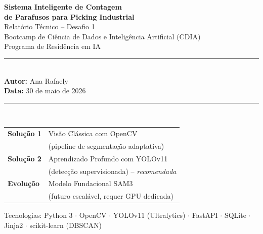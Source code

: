 \documentclass[12pt,a4paper]{article}
\begin{document}
\begin{titlepage}
  \centering
  \vspace*{1.8cm}
  {\huge\bfseries\color{primary}
    Sistema Inteligente de Contagem\\[0.4em]
    de Parafusos para Picking Industrial\\[1.2em]}
  {\large\color{darkgray}
    Relat\'orio T\'ecnico -- Desafio 1\\
    Bootcamp de Ci\^encia de Dados e Intelig\^encia Artificial (CDIA)\\
    Programa de Resid\^encia em IA\\[1.8cm]}
  \rule{\linewidth}{0.5pt}\\[0.4em]
  {\normalsize
    \textbf{Autor:} Ana Rafaely\\[0.3em]
    \textbf{Data:} 30 de maio de 2026\\[0.3em]
  }
  \rule{\linewidth}{0.5pt}\\[1.2cm]
  \begin{tcolorbox}[colback=lightblue, colframe=primary, arc=6pt,
                    title={\bfseries Solu\c{c}\~oes desenvolvidas e comparadas \quad(vers\~ao 2)}]
    \begin{tabular}{ll}
      \textbf{Solu\c{c}\~ao 1} & Vis\~ao Cl\'assica com OpenCV\\
                                & (pipeline de segmenta\c{c}\~ao adaptativa)\\[4pt]
      \textbf{Solu\c{c}\~ao 2} & Aprendizado Profundo com YOLOv11\\
                                & (detec\c{c}\~ao supervisionada) -- \emph{recomendada}\\[4pt]
      \textbf{Evolu\c{c}\~ao}  & Modelo Fundacional SAM3\\
                                & (futuro escal\'avel, requer GPU dedicada)\\
    \end{tabular}
  \end{tcolorbox}
  \vfill
  {\small\color{gray}
    Tecnologias: Python 3 $\cdot$ OpenCV $\cdot$ YOLOv11 (Ultralytics) $\cdot$
    FastAPI $\cdot$ SQLite $\cdot$ Jinja2 $\cdot$ scikit-learn (DBSCAN)
  }
\end{titlepage}

\tableofcontents
\newpage

\end{document}
